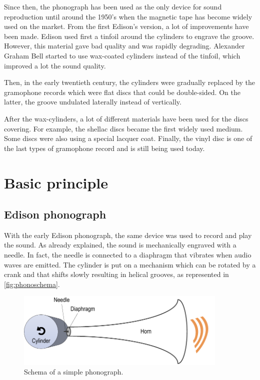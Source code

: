 Since then, the phonograph has been used as the only device for sound reproduction until around the 1950's when the magnetic tape has become widely used on the market. From the first Edison's version, a lot of improvements have been made. Edison used first a tinfoil around the cylinders to engrave the groove. However, this material gave bad quality and was rapidly degrading. Alexander Graham Bell started to use wax-coated cylinders instead of the tinfoil, which improved a lot the sound quality.

Then, in the early twentieth century, the cylinders were gradually replaced by the gramophone records which were flat discs that could be double-sided. On the latter, the groove undulated laterally instead of vertically.

After the wax-cylinders, a lot of different materials have been used for the discs covering. For example, the shellac discs became the first widely used medium. Some discs were also using a special lacquer coat. Finally, the vinyl disc is one of the last types of gramophone record and is still being used today.

\section{Basic principle}

\subsection{Edison phonograph}

With the early Edison phonograph, the same device was used to record and play the sound. As already explained, the sound is mechanically engraved with a needle. In fact, the needle is connected to a diaphragm that vibrates when audio waves are emitted. The cylinder is put on a mechanism which can be rotated by a crank and that shifts slowly resulting in helical grooves, as represented in \autoref{fig:phonoschema}.

\begin{figure}[!ht]
\centering
\includegraphics[width=0.9\textwidth]{images/phono-schema}
\caption{Schema of a simple phonograph.}
\label{fig:phonoschema}
\end{figure}

